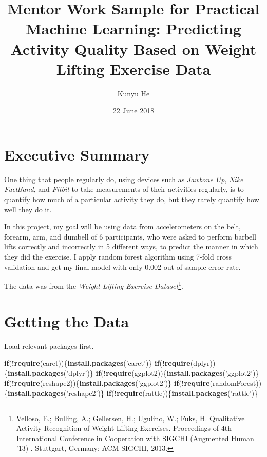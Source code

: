 \documentclass[]{article}
\title{Mentor Work Sample for Practical Machine Learning: Predicting Activity
Quality Based on Weight Lifting Exercise Data}
\author{Kunyu He}
\date{22 June 2018}
\newenvironment{Shaded}{\begin{snugshade}}{\end{snugshade}}
\newcommand{\KeywordTok}[1]{\textcolor[rgb]{0.13,0.29,0.53}{\textbf{#1}}}
\newcommand{\StringTok}[1]{\textcolor[rgb]{0.31,0.60,0.02}{#1}}
\newcommand{\ControlFlowTok}[1]{\textcolor[rgb]{0.13,0.29,0.53}{\textbf{#1}}}
\newcommand{\OperatorTok}[1]{\textcolor[rgb]{0.81,0.36,0.00}{\textbf{#1}}}
\newcommand{\NormalTok}[1]{#1}
\let\rmarkdownfootnote\footnote%
\def\footnote{\protect\rmarkdownfootnote}
\begin{document}
\maketitle

\section{Executive Summary}\label{executive-summary}

One thing that people regularly do, using devices such as \emph{Jawbone
Up}, \emph{Nike FuelBand}, and \emph{Fitbit} to take measurements of
their activities regularly, is to quantify how much of a particular
activity they do, but they rarely quantify how well they do it.

In this project, my goal will be using data from accelerometers on the
belt, forearm, arm, and dumbell of 6 participants, who were asked to
perform barbell lifts correctly and incorrectly in 5 different ways, to
predict the manner in which they did the exercise. I apply random forest
algorithm using 7-fold cross validation and get my final model with only
0.002 out-of-sample error rate.

The data was from the \emph{Weight Lifting Exercise Dataset}\footnote{Velloso,
  E.; Bulling, A.; Gellersen, H.; Ugulino, W.; Fuks, H. Qualitative
  Activity Recognition of Weight Lifting Exercises. Proceedings of 4th
  International Conference in Cooperation with SIGCHI (Augmented Human
  '13) . Stuttgart, Germany: ACM SIGCHI, 2013.}.

\section{Getting the Data}\label{getting-the-data}

Load relevant packages first.

\begin{Shaded}
\begin{Highlighting}[]
\ControlFlowTok{if}\NormalTok{(}\OperatorTok{!}\KeywordTok{require}\NormalTok{(caret))\{}\KeywordTok{install.packages}\NormalTok{(}\StringTok{'caret'}\NormalTok{)\}}
\ControlFlowTok{if}\NormalTok{(}\OperatorTok{!}\KeywordTok{require}\NormalTok{(dplyr))\{}\KeywordTok{install.packages}\NormalTok{(}\StringTok{'dplyr'}\NormalTok{)\}}
\ControlFlowTok{if}\NormalTok{(}\OperatorTok{!}\KeywordTok{require}\NormalTok{(ggplot2))\{}\KeywordTok{install.packages}\NormalTok{(}\StringTok{'ggplot2'}\NormalTok{)\}}
\ControlFlowTok{if}\NormalTok{(}\OperatorTok{!}\KeywordTok{require}\NormalTok{(reshape2))\{}\KeywordTok{install.packages}\NormalTok{(}\StringTok{'ggplot2'}\NormalTok{)\}}
\ControlFlowTok{if}\NormalTok{(}\OperatorTok{!}\KeywordTok{require}\NormalTok{(randomForest))\{}\KeywordTok{install.packages}\NormalTok{(}\StringTok{'reshape2'}\NormalTok{)\}}
\ControlFlowTok{if}\NormalTok{(}\OperatorTok{!}\KeywordTok{require}\NormalTok{(rattle))\{}\KeywordTok{install.packages}\NormalTok{(}\StringTok{'rattle'}\NormalTok{)\}}
\end{Highlighting}
\end{Shaded}
\end{document}
